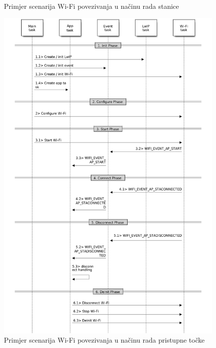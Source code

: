 \begin{figure}[ht]
\begin{minipage}[t]{0.4\textwidth}
		\caption{Primjer scenarija Wi-Fi povezivanja u načinu rada stanice \cite{espressif}}
		\label{fig:station_scenario}
	\end{minipage}
	\hspace*{\fill}
	\begin{minipage}[t]{0.4\textwidth}
		\includegraphics[width=\linewidth]{imgs/ap_scenario}
		\caption{Primjer scenarija Wi-Fi povezivanja u načinu rada pristupne točke \cite{espressif}}
		\label{fig:ap_scenario}
	\end{minipage}
\end{figure}

